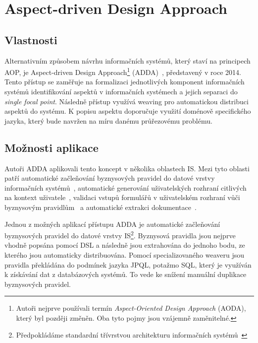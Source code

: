 \section{Aspect-driven Design Approach}

\subsection{Vlastnosti}

Alternativním způsobem návrhu informačních systémů, který staví na principech \gls{AOP},
je Aspect-driven Design Approach\footnote{Autoři nejprve používali termín \textit{Aspect-Oriented
Design Approach} (AODA), který byl později změněn. Oba tyto pojmy jsou vzájemně zaměnitelné.}
(\gls{ADDA})~\cite{cemus2014aspect}, představený v roce 2014.
Tento přístup se zaměřuje na formalizaci jednotlivých komponent informačních systémů identifikování aspektů
v informačních systémech a jejich separaci do \textit{single focal point}.
Následně přístup využívá weaving pro automatickou distribuci aspektů do systému.
K popisu aspektu doporučuje využití doménově specifického jazyka, který bude navržen na
míru danému průřezovému problému.

\subsection{Možnosti aplikace}

Autoři \gls{ADDA} aplikovali tento koncept v několika oblastech \gls{IS}.
Mezi tyto oblasti patří automatické začleňování byznysových pravidel
do datové vrstvy informačních systémů~\cite{cemus2015automated}, automatické
generování uživatelských rozhraní citlivých na kontext uživatele~\cite{cemus2017separation},
validaci vstupů formulářů v uživatelském rozhraní vůči byznysovým pravidlům~\cite{cemus2016context}\cite{cemus2017separation}
a automatické extrakci dokumentace~\cite{cemus2017automated}.


Jednou z možných aplikací přístupu \gls{ADDA} je automatické začleňování
byznysových pravidel do datové vrstvy \gls{IS}\footnote{Předpokládáme standardní
třívrstvou architekturu informačních systémů~\cite{fowler2002patterns}}.
Byznysová pravidla jsou nejprve vhodně popsána pomocí \gls{DSL} a následně jsou
extrahována do jednoho bodu, ze kterého jsou automaticky distribuována.
Pomocí specializovaného weaveru jsou pravidla překládána do podmínek
jazyka \gls{JPQL}, potažmo \gls{SQL}, který je využíván k získávání dat
z databázových systémů. To vede ke snížení manuální duplikace byznysových
pravidel.

